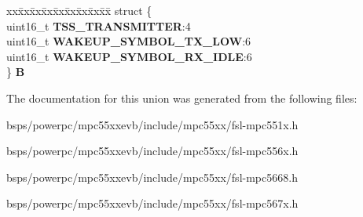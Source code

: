 \begin{DoxyCompactItemize}
\begin{tabbing}
\end{tabbing}\item 
\mbox{\label{unionuPCR5_a438f7b550b0550ab97f3c313286011dd}} 
\begin{tabbing}
xx\=xx\=xx\=xx\=xx\=xx\=xx\=xx\=xx\=\kill
struct \{\\
\>uint16\_t {\bfseries TSS\_TRANSMITTER}:4\\
\>uint16\_t {\bfseries WAKEUP\_SYMBOL\_TX\_LOW}:6\\
\>uint16\_t {\bfseries WAKEUP\_SYMBOL\_RX\_IDLE}:6\\
\} {\bfseries B}\\

\end{tabbing}\end{DoxyCompactItemize}


The documentation for this union was generated from the following files\+:\begin{DoxyCompactItemize}
\item 
bsps/powerpc/mpc55xxevb/include/mpc55xx/fsl-\/mpc551x.\+h\item 
bsps/powerpc/mpc55xxevb/include/mpc55xx/fsl-\/mpc556x.\+h\item 
bsps/powerpc/mpc55xxevb/include/mpc55xx/fsl-\/mpc5668.\+h\item 
bsps/powerpc/mpc55xxevb/include/mpc55xx/fsl-\/mpc567x.\+h\end{DoxyCompactItemize}
